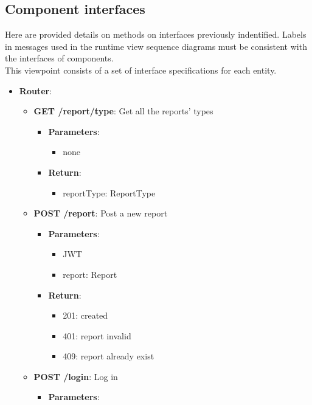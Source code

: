 \documentclass{article}
\begin{document}
\newpage
\subsection{Component interfaces}
Here are provided details on methods on interfaces previously indentified. Labels in messages used in the runtime view sequence diagrams must be consistent with the interfaces of components.
\\
This viewpoint consists of a set of interface specifications for each entity.

\begin{itemize}
	\item \textbf{Router}:
		\begin{itemize}
			\item \textbf{GET /report/type}:
				Get all the reports' types
				\begin{itemize}
					\item \textbf{Parameters}:
						\begin{itemize}
							\item none
						\end{itemize}
					\item \textbf{Return}:
						\begin{itemize}
							\item reportType: \textlangle{}ReportType\textrangle{}
						\end{itemize}
				\end{itemize}
			\item \textbf{POST /report}:
				Post a new report
				\begin{itemize}
					\item \textbf{Parameters}:
						\begin{itemize}
							\item JWT
							\item report: Report
						\end{itemize}
					\item \textbf{Return}:
						\begin{itemize}
							\item 201: created
							\item 401: report invalid
							\item 409: report already exist
						\end{itemize}
				\end{itemize}
			\item \textbf{POST /login}:
				Log in
				\begin{itemize}
					\item \textbf{Parameters}:

\end{itemize}
\end{itemize}
\end{itemize}
\end{document}
